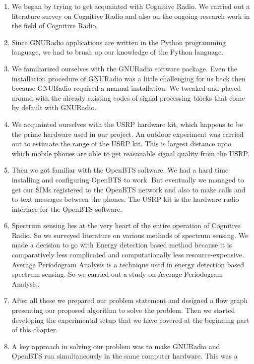 \begin{enumerate}
    \item We began by trying to get acquainted with Cognitive Radio. We 
    carried out a literature survey on Cognitive Radio and also on the ongoing 
    research work in the field of Cognitive Radio.
    \item Since GNURadio applications are written in the Python programming 
    language, we had to brush up our knowledge of the Python language.
    \item We familiarized ourselves with the GNURadio software package. Even 
    the installation procedure of GNURadio was a little challenging for us
    back then because GNURadio required a manual installation. We tweaked
    and played around with the already existing codes of signal processing
    blocks that come by default with GNURadio.
    \item We acquainted ourselves with the USRP hardware kit, which happens to
    be the prime hardware used in our project. An outdoor experiment was
    carried out to estimate the range of the USRP kit. This is largest 
    distance upto which mobile phones are able to get reasonable signal
    quality from the USRP.
    \item Then we got familiar with the OpenBTS software. We had a hard time
    installing and configuring OpenBTS to work. But eventually we managed to 
    get our SIMs registered to the OpenBTS network and also to make calls and
    to text messages between the phones. The USRP kit is the hardware radio 
    interface for the OpenBTS software.
    \item Spectrum sensing lies at the very heart of the entire operation of 
    Cognitive Radio. So we surveyed literature on various methods of spectrum
    sensing. We made a decision to go with Energy detection based method 
    because it is comparatively less complicated and computationally less 
    resource-expensive. Average Periodogram Analysis is a technique used in 
    energy detection based spectrum sensing. So we carried out a study on
    Average Periodogram Analysis.
    \item After all these we prepared our problem statement and designed a 
    flow graph presenting our proposed algorithm to solve the problem. Then 
    we started developing the experimental setup that we have covered at the
    beginning part of this chapter.
    \item A key approach in solving our problem was to make GNURadio and 
    OpenBTS run simultaneously in the same computer hardware. This was a

\end{enumerate}
